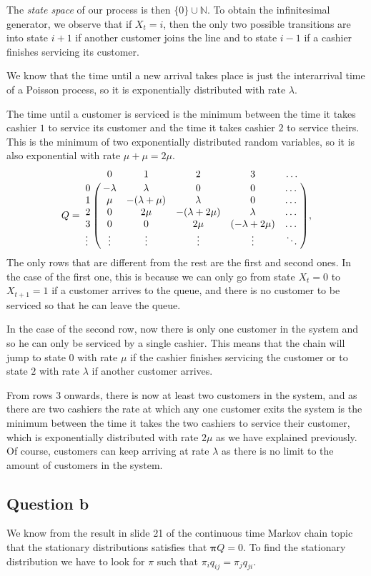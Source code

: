 \documentclass[11pt, a4paper]{article}
\begin{document}
The \emph{state space} of our process is then $\{0\} \cup \mathbb{N}$. 
To obtain the infinitesimal generator, we observe that if $X_t = i$, then the only two possible transitions are into state $i+1$ if another customer joins the line and to state $i-1$ if a cashier finishes servicing its customer.

We know that the time until a new arrival takes place is just the interarrival time of a Poisson process, so it is exponentially distributed with rate $\lambda$.

The time until a customer is serviced is the minimum between the time it takes cashier $1$ to service its customer and the time it takes cashier $2$ to service theirs. 
This is the minimum of two exponentially distributed random variables, so it is also exponential with rate $\mu + \mu = 2\mu$.
\[
Q = \bordermatrix{%
	 & 0 & 1 & 2 & 3 & \dots \cr
	0& -\lambda & \lambda  & 0        & 0        & \dots  \cr
	1 & \mu       & -(\lambda+\mu) & \lambda  & 0        & \dots  \cr
	2& 0        & 2\mu        & -(\lambda+2\mu) & \lambda  & \dots  \cr
	3 &0        & 0        & 2\mu        & (-\lambda + 2\mu) & \dots  \cr
	\vdots & \vdots   & \vdots   & \vdots   & \vdots   & \ddots
},
\]
The only rows that are different from the rest are the first and second ones.
In the case of the first one, this is because we can only go from state $X_t = 0$ to $X_{t+1} = 1$ if a customer arrives to the queue, and there is no customer to be serviced so that he can leave the queue.

In the case of the second row, now there is only one customer in the system and so he can only be serviced by a single cashier. This means that the chain will jump to state $0$ with rate $\mu$ if the cashier finishes servicing the customer or to state $2$ with rate $\lambda$ if another customer arrives.

From rows $3$ onwards, there is now at least two customers in the system, and as there are two cashiers the rate at which any one customer exits the system is the minimum between the time it takes the two cashiers to service their customer, which is exponentially distributed with rate $2\mu$ as we have explained previously.
Of course, customers can keep arriving at rate $\lambda$ as there is no limit to the amount of customers in the system.

\subsection*{Question b}
We know from the result in slide 21 of the continuous time Markov chain topic that the stationary distributions satisfies that $\bm{\pi}Q = 0$.
To find the stationary distribution we have to look for $\pi$ such that $\pi_i q_{ij} = \pi_j q_{ji}$.
\end{document}
